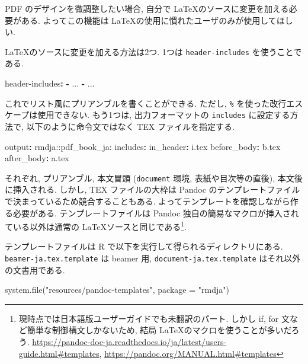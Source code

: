\documentclass[
]{bxjsbook}
\newenvironment{Shaded}{\begin{snugshade}}{\end{snugshade}}
\newcommand{\AttributeTok}[1]{\textcolor[rgb]{0.77,0.63,0.00}{#1}}
\newcommand{\FunctionTok}[1]{\textcolor[rgb]{0.00,0.00,0.00}{#1}}
\newcommand{\KeywordTok}[1]{\textcolor[rgb]{0.13,0.29,0.53}{\textbf{#1}}}
\newcommand{\NormalTok}[1]{#1}
\newcommand{\StringTok}[1]{\textcolor[rgb]{0.31,0.60,0.02}{#1}}
\theoremstyle{definition}
\theoremstyle{definition}
\theoremstyle{definition}
\theoremstyle{remark}
\begin{document}
PDF のデザインを微調整したい場合, 自分で
\LaTeX のソースに変更を加える必要がある. よってこの機能は
\LaTeX の使用に慣れたユーザのみが使用してほしい.

\LaTeX のソースに変更を加える方法は2つ. 1つは \texttt{header-includes}
を使うことである.

\begin{Shaded}
\begin{Highlighting}[]
\FunctionTok{header{-}includes}\KeywordTok{:}
\AttributeTok{  }\KeywordTok{{-}}\AttributeTok{ ...}
\AttributeTok{  }\KeywordTok{{-}}\AttributeTok{ ...}
\end{Highlighting}
\end{Shaded}

これでリスト風にプリアンブルを書くことができる. ただし, \texttt{\%}
を使った改行エスケープは使用できない. もう1つは, 出力フォーマットの
\texttt{includes} に設定する方法で, 以下のように命令文ではなく TEX
ファイルを指定する.

\begin{Shaded}
\begin{Highlighting}[]
\FunctionTok{output}\KeywordTok{:}\AttributeTok{ rmdja::pdf\_book\_ja:}
\AttributeTok{  }\FunctionTok{includes}\KeywordTok{:}
\AttributeTok{    }\FunctionTok{in\_header}\KeywordTok{:}\AttributeTok{ i.tex}
\AttributeTok{    }\FunctionTok{before\_body}\KeywordTok{:}\AttributeTok{ b.tex}
\AttributeTok{    }\FunctionTok{after\_body}\KeywordTok{:}\AttributeTok{ a.tex}
\end{Highlighting}
\end{Shaded}

それぞれ, プリアンブル, 本文冒頭 (\texttt{document} 環境,
表紙や目次等の直後), 本文後に挿入される. しかし, TEX ファイルの大枠は
Pandoc のテンプレートファイルで決まっているため競合することもある.
よってテンプレートを確認しながら作る必要がある. テンプレートファイルは
Pandoc 独自の簡易なマクロが挿入されている以外は通常の
\LaTeX ソースと同じである\footnote{現時点では日本語版ユーザーガイドでも未翻訳のパート.
  しかし if, for 文など簡単な制御構文しかないため, 結局
  \LaTeX のマクロを使うことが多いだろう.
  \url{https://pandoc-doc-ja.readthedocs.io/ja/latest/users-guide.html\#templates},
  \url{https://pandoc.org/MANUAL.html\#templates}}.

テンプレートファイルは R で以下を実行して得られるディレクトリにある.
\texttt{beamer-ja.tex.template} は beamer 用,
\texttt{document-ja.tex.template} はそれ以外の文書用である.

\begin{Shaded}
\begin{Highlighting}[numbers=left,,]
\FunctionTok{system.file}\NormalTok{(}\StringTok{"resources/pandoc{-}templates"}\NormalTok{, }\AttributeTok{package =} \StringTok{"rmdja"}\NormalTok{)}
\end{Highlighting}
\end{Shaded}
\end{document}
